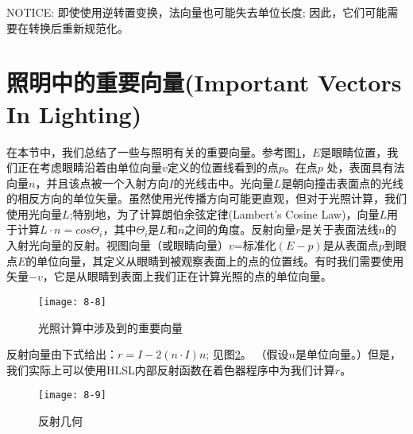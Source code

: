 \begin{flushleft}
NOTICE: 即使使用逆转置变换，法向量也可能失去单位长度; 因此，它们可能需要在转换后重新规范化。
\end{flushleft}

\section{照明中的重要向量(Important Vectors In Lighting)}
\begin{flushleft}
在本节中，我们总结了一些与照明有关的重要向量。参考图\ref{fig:8-8}，$E$是眼睛位置，我们正在考虑眼睛沿着由单位向量$v$定义的位置线看到的点$p$。在点$p$ 处，表面具有法向量$n$，并且该点被一个入射方向$I$的光线击中。光向量$L$是朝向撞击表面点的光线的相反方向的单位矢量。虽然使用光传播方向可能更直观，但对于光照计算，我们使用光向量$L$;特别地，为了计算朗伯余弦定律(Lambert’s Cosine Law)，向量$L$用于计算$L\cdot n=cos\Theta_{i}$，其中$\Theta_{i}$是$L$和$n$之间的角度。反射向量$r$是关于表面法线$n$的入射光向量的反射。视图向量（或眼睛向量）$v$=标准化$(E-p)$是从表面点$p$到眼点$E$的单位向量，其定义从眼睛到被观察表面上的点的位置线。有时我们需要使用矢量$-v$，它是从眼睛到表面上我们正在计算光照的点的单位向量。\\
\end{flushleft}

\begin{figure}[h]
    \label{fig:8-8}
    \texttt{[image: 8-8]}
    \centering
    \caption{光照计算中涉及到的重要向量}
\end{figure}

\begin{flushleft}
反射向量由下式给出：$r=I-2(n\cdot I)n$; 见图\ref{fig:8-9}。 （假设$n$是单位向量。）但是，我们实际上可以使用HLSL内部反射函数在着色器程序中为我们计算$r$。
\end{flushleft}

\begin{figure}[h]
    \label{fig:8-9}
    \texttt{[image: 8-9]}
    \centering
    \caption{反射几何}
\end{figure}

